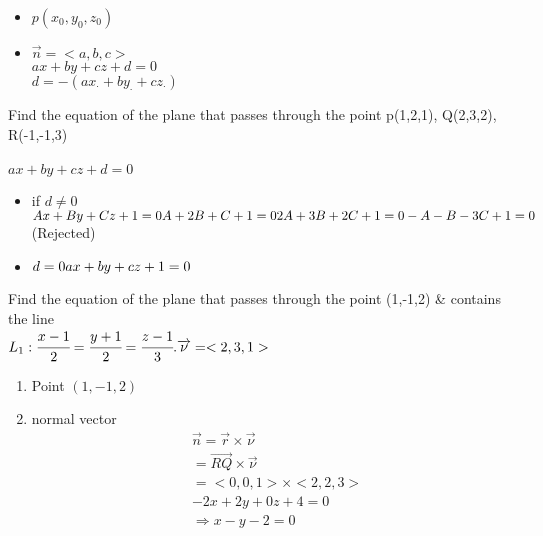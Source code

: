 {{}}
\begin{itemize}
    \item $ p(x_0 , y_0 , z_0)$
    \item $\overrightarrow{n} = <a,b,c>$\\
$ax+by+cz+d = 0$\\
$d=-(ax_\cdot + by_\cdot +cz_\cdot)$
\end{itemize}
\noindent{\color{smalt(darkpowderblue)}\rule{\linewidth}{.2mm}}
\begin{example}
Find the equation of the plane that passes through the point 
p(1,2,1), Q(2,3,2), R(-1,-1,3)\\
{{}} \\
$ax+by+cz+d=0 $ 
\begin{itemize}
    \item if $d\neq 0 $ \\ $Ax+By+Cz+1=0 \\ 
    A+2B+C+1=0 \\ 2A+3B+2C+1=0 \\ -A-B-3C+1=0 $ \hspace{1cm} (Rejected)
    \item $d=0 \\ ax+by+cz+1=0$
\end{itemize}
\end{example}
\noindent{\color{smalt(darkpowderblue)}\rule{\linewidth}{.2mm}}
\begin{example}
Find the equation of the plane that passes through the point (1,-1,2) \& contains the line \\
$L_{1} : \cfrac{x-1}{2} = \cfrac{y+1}{2} = \cfrac{z-1}{3}. \overrightarrow{\nu} = <2,3,1>$\\
{{}}
\begin{enumerate}
    \item  Point $(1,-1,2)$
    \item  normal vector 
    \begin{align*}
&\overrightarrow{n} = \overrightarrow{r} \times \overrightarrow{\nu}\\
&=\overrightarrow{RQ} \times \overrightarrow{\nu}\\
&=<0,0,1> \times <2,2,3>\\
&-2x+2y+0z+4=0\\
&\Rightarrow x-y-2=0
\end{align*}
\end{enumerate}
\end{example} 
